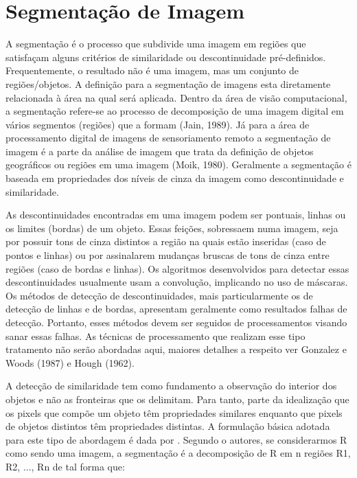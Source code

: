 \documentclass[openright]{UFRGS} %
\begin{document}
 
\section{Segmentação de Imagem}

A segmentação é o processo que subdivide uma
imagem em regiões que satisfaçam alguns critérios
de similaridade ou descontinuidade pré-definidos. Frequentemente, o resultado não é uma imagem, mas um conjunto de regiões/objetos.
A definição para a segmentação de imagens esta diretamente relacionada à área na qual
será aplicada. Dentro da área de visão computacional, a segmentação refere-se ao
processo de decomposição de uma imagem digital em vários segmentos (regiões) que a
formam (Jain, 1989). Já para a área de processamento digital de imagens de
sensoriamento remoto a segmentação de imagem é a parte da análise de imagem que
trata da definição de objetos geográficos ou regiões em uma imagem (Moik, 1980). Geralmente a segmentação é baseada em propriedades
dos níveis de cinza da imagem como descontinuidade e similaridade.

As descontinuidades encontradas em uma imagem podem ser pontuais, linhas ou os
limites (bordas) de um objeto. Essas feições, sobressaem numa imagem, seja por possuir
tons de cinza distintos a região na quais estão inseridas (caso de pontos e linhas) ou por
assinalarem mudanças bruscas de tons de cinza entre regiões (caso de bordas e linhas).
Os algoritmos desenvolvidos para detectar essas descontinuidades usualmente usam a
convolução, implicando no uso de máscaras.
Os métodos de detecção de descontinuidades, mais particularmente os de detecção de
linhas e de bordas, apresentam geralmente como resultados falhas de detecção. Portanto,
esses métodos devem ser seguidos de processamentos visando sanar essas falhas. As
técnicas de processamento que realizam esse tipo tratamento não serão abordadas aqui,
maiores detalhes a respeito ver Gonzalez e Woods (1987) e Hough (1962). 

A detecção de similaridade tem como fundamento a observação do interior dos objetos e
não as fronteiras que os delimitam. Para tanto, parte da idealização que os pixels que
compõe um objeto têm propriedades similares enquanto que pixels de objetos distintos
têm propriedades distintas.
A formulação básica adotada para este tipo de abordagem é dada por \cite{fu1981survey}.
Segundo o autores, se considerarmos R como sendo uma imagem, a segmentação é a
decomposição de R em n regiões R1, R2, ..., Rn de tal forma que:
\end{document}

